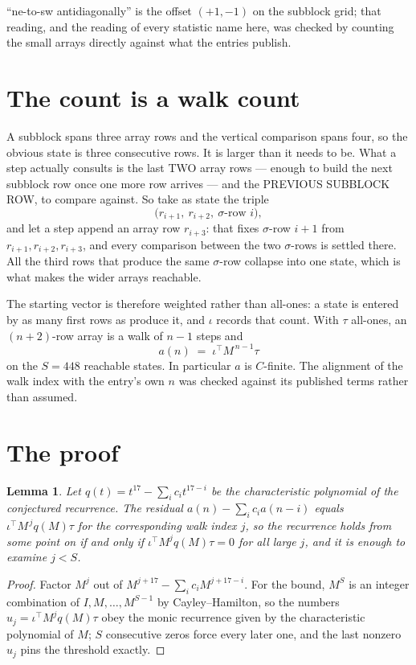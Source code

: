 \documentclass[11pt,a4paper]{article}
\theoremstyle{plain}
\newtheorem{lemma}[theorem]{Lemma}
\theoremstyle{definition}
\begin{document}
``ne-to-sw antidiagonally'' is the offset $(+1,-1)$ on the subblock grid; that reading, and
the reading of every statistic name here, was checked by counting the small arrays directly
against what the entries publish.

\section{The count is a walk count}

A subblock spans three array rows and the vertical comparison spans four, so the obvious state
is three consecutive rows. It is larger than it needs to be. What a step actually consults is
the last TWO array rows --- enough to build the next subblock row once one more row arrives ---
and the PREVIOUS SUBBLOCK ROW, to compare against. So take as state the triple
\[
\bigl(r_{i+1},\ r_{i+2},\ \sigma\text{-row }i\bigr),
\]
and let a step append an array row $r_{i+3}$: that fixes $\sigma$-row $i+1$ from
$r_{i+1},r_{i+2},r_{i+3}$, and every comparison between the two $\sigma$-rows is settled
there. All the third rows that produce the same $\sigma$-row collapse into one state, which is
what makes the wider arrays reachable.

The starting vector is therefore weighted rather than all-ones: a state is entered by as many
first rows as produce it, and $\iota$ records that count. With $\tau$ all-ones, an
$(n+2)$-row array is a walk of $n-1$ steps and
\[
a(n)\;=\;\iota^{\!\top}M^{\,n-1}\tau
\]
on the $S=448$ reachable states. In particular $a$ is $C$-finite. The alignment of the walk
index with the entry's own $n$ was checked against its published terms rather than assumed.

\section{The proof}

\begin{lemma}\label{lem:crit}
Let $q(t)=t^{17}-\sum_i c_it^{17-i}$ be the characteristic polynomial of the
conjectured recurrence. The residual $a(n)-\sum_ic_ia(n-i)$ equals
$\iota^{\!\top}M^{\,j}q(M)\tau$ for the corresponding walk index $j$, so the recurrence
holds from some point on if and only if $\iota^{\!\top}M^{j}q(M)\tau=0$ for all large $j$,
and it is enough to examine $j<S$.
\end{lemma}

\begin{proof}
Factor $M^{j}$ out of $M^{j+17}-\sum_ic_iM^{j+17-i}$. For the bound, $M^{S}$
is an integer combination of $I,M,\dots,M^{S-1}$ by Cayley--Hamilton, so the numbers
$u_j=\iota^{\!\top}M^{j}q(M)\tau$ obey the monic recurrence given by the characteristic
polynomial of $M$; $S$ consecutive zeros force every later one, and the last nonzero $u_j$
pins the threshold exactly.
\end{proof}
\end{document}
